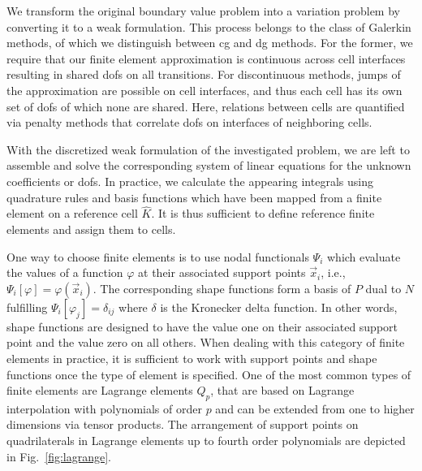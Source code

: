 We transform the original boundary value problem into a variation problem by converting it to a weak formulation. This process belongs to the class of Galerkin methods, of which we distinguish between \gls{cg} and \gls{dg} methods. For the former, we require that our finite element approximation is continuous across cell interfaces resulting in shared \glspl{dof} on all transitions. For discontinuous methods, jumps of the approximation are possible on cell interfaces, and thus each cell has its own set of \glspl{dof} of which none are shared. Here, relations between cells are quantified via penalty methods that correlate \glspl{dof} on interfaces of neighboring cells.

With the discretized weak formulation of the investigated problem, we are left to assemble and solve the corresponding system of linear equations for the unknown coefficients or \glspl{dof}. In practice, we calculate the appearing integrals using quadrature rules and basis functions which have been mapped from a finite element on a reference cell $\widehat{K}$. It is thus sufficient to define reference finite elements and assign them to cells.

One way to choose finite elements is to use nodal functionals $\Psi_i$ which evaluate the values of a function $\varphi$ at their associated support points $\vec{x}_i$, i.e., $\Psi_i[\varphi] = \varphi(\vec{x}_i)$. The corresponding shape functions form a basis of $P$ dual to $N$ fulfilling $\Psi_i[\varphi_j] = \delta_{ij}$ where $\delta$ is the Kronecker delta function. In other words, shape functions are designed to have the value one on their associated support point and the value zero on all others.
When dealing with this category of finite elements in practice, it is sufficient to work with support points and shape functions once the type of element is specified. One of the most common types of finite elements are Lagrange elements $Q_p$, that are based on Lagrange interpolation with polynomials of order $p$ and can be extended from one to higher dimensions via tensor products. The arrangement of support points on quadrilaterals in Lagrange elements up to fourth order polynomials are depicted in Fig.~\ref{fig:lagrange}.

